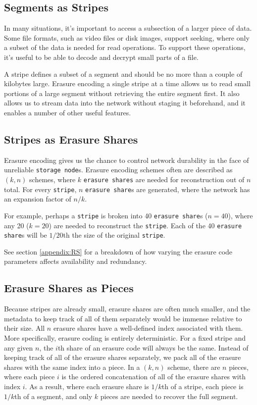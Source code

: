 \documentclass[11pt,fleqn,openany]{book}
\newcommand{\x}[1]{{\tt #1}} \newcommand{\code}[1]{{\em #1}}
\begin{document}
\subsection{Segments as Stripes}

In many situations, it's important to access a subsection of a larger piece of
data. Some file formats, such as video files or disk images, support seeking,
where only a subset of the data is needed for read operations.
To support these operations,
it's useful to be able to decode and decrypt small parts of a file.

A stripe defines a subset of a segment and should be no more than a
couple of kilobytes large. Erasure encoding
a single stripe at a time allows us to read small portions of a
large segment without retrieving the entire segment first.
It also allows us to stream data into the
network without staging it beforehand, and it enables a number of other useful
features.

\subsection{Stripes as Erasure Shares}

Erasure encoding gives us the chance to control network durability in the face
of unreliable \x{storage node}s. Erasure encoding schemes often are
described as $(k, n)$ schemes, where $k$ \x{erasure shares} are needed for
reconstruction out of $n$ total. For every \x{stripe}, $n$ \x{erasure share}s
are generated, where the network has an expansion factor of $n/k$.

For example, perhaps a \x{stripe} is broken into 40 \x{erasure share}s
($n=40$), where any 20 ($k=20$) are needed to reconstruct the \x{stripe}. Each
of the 40 \x{erasure share}s will be $1/20$th the size of the original
\x{stripe}.

See section \ref{appendix:RS} for a breakdown of how varying the erasure code
parameters affects availability and redundancy.

\subsection{Erasure Shares as Pieces}

Because stripes are already small, erasure shares are often much
smaller, and the metadata to keep track of all of them separately would be
immense relative to their size.
All $n$ erasure shares have a well-defined index associated
with them. More specifically, erasure coding is entirely deterministic. For
a fixed stripe and any given $n$, the $i$th share of an erasure
code will always be the same.
Instead of keeping track of all of the
erasure shares separately, we pack all of the erasure shares with the
same index into a piece.
In a $(k, n)$ scheme, there are $n$ pieces, where each
piece $i$ is the ordered concatenation of all of the erasure shares with
index $i$. As a result, where each erasure share is $1/k$th of a
stripe, each piece is $1/k$th of a segment, and only $k$
pieces are needed to recover the full segment.
\end{document}

